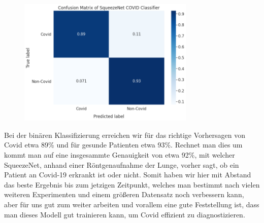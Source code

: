 \begin{figure}[H]
    \centering
    \includegraphics[width=0.75\textwidth]{../results/Binary_SqueezeNet_conf_matrix.png}
    \caption{}
\end{figure}

Bei der binären Klassifizierung erreichen wir für das richtige Vorhersagen von Covid etwa 89\% und für gesunde Patienten etwa 93\%. Rechnet man dies um kommt man auf eine insgesammte Genauigkeit von etwa 92\%, mit welcher SqueezeNet, anhand einer Röntgenaufnahme der Lunge, vorher sagt, ob ein Patient an Covid-19 erkrankt ist oder nicht. Somit haben wir hier mit Abstand das beste Ergebnis bis zum jetzigen Zeitpunkt, welches man bestimmt nach vielen weiteren Experimenten und einem größeren Datensatz noch verbessern kann, aber für uns gut zum weiter arbeiten und vorallem eine gute Feststellung ist, dass man dieses Modell gut trainieren kann, um Covid effizient zu diagnostizieren.
